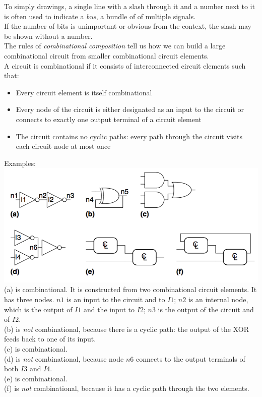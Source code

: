 \documentclass[12pt]{article}
\theoremstyle{definition}
\begin{document}
  To simply drawings, a single line with a slash through it and a number next to it is often used to indicate a \emph{bus}, a bundle of of multiple signals. \\
  If the number of bits is unimportant or obvious from the context, the slash may be shown without a number. \\

  The rules of \emph{combinational composition} tell us how we can build a large combinational circuit from smaller combinational circuit elements. \\
  A circuit is combinational if it consists of interconnected circuit elements such that:
  \begin{itemize}
    \item Every circuit element is itself combinational
    \item Every node of the circuit is either designated as an input to the circuit or connects to exactly one output terminal of a circuit element
    \item The circuit contains no cyclic paths: every path through the circuit visits each circuit node at most once
  \end{itemize}

  Examples: \\
  \includegraphics[width=1.0\textwidth]{pictures/combinationalCircuitExample.png}
  (a) is combinational. It is constructed from two combinational circuit elements. It has three nodes. $n1$ is an input to the circuit and to $I1$; $n2$ is an internal node, which is the output of $I1$ and the input to $I2$; $n3$ is the output of the circuit and of $I2$. \\
  (b) is \emph{not} combinational, because there is a cyclic path: the output of the XOR feeds back to one of its input. \\
  (c) is combinational. \\
  (d) is \emph{not} combinational, because node $n6$ connects to the output terminals of both $I3$ and $I4$. \\
  (e) is combinational. \\
  (f) is \emph{not} combinational, because it has a cyclic path through the two elements. \\
\end{document}
